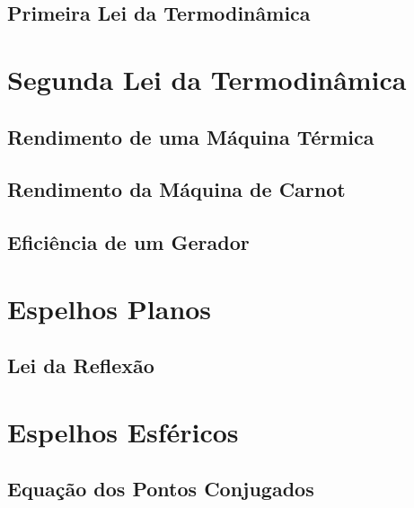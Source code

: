 \subsection{Primeira Lei da Termodinâmica}







\section{Segunda Lei da Termodinâmica}

\subsection{Rendimento de uma Máquina Térmica}

\subsection{Rendimento da Máquina de Carnot}

\subsection{Eficiência de um Gerador}












\section{Espelhos Planos}

\subsection{Lei da Reflexão}







\section{Espelhos Esféricos}

\subsection{Equação dos Pontos Conjugados}


